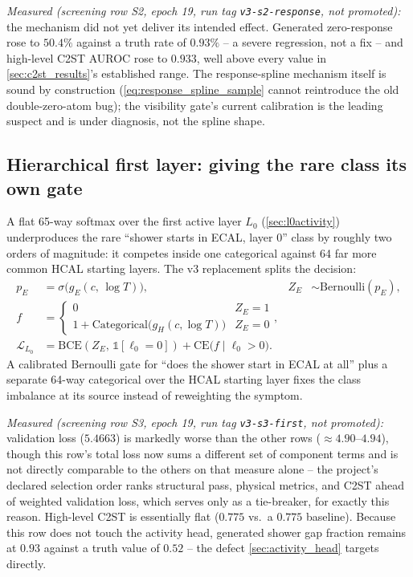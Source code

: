 \documentclass[10pt,a4paper]{article}
\begin{document}
\emph{Measured (screening row S2, epoch 19, run tag \texttt{v3-s2-response}, not promoted):} the mechanism did not yet deliver its intended effect. Generated zero-response rose to $50.4\%$ against a truth rate of $0.93\%$ -- a severe regression, not a fix -- and high-level C2ST AUROC rose to $0.933$, well above every value in \cref{sec:c2st_results}'s established range. The response-spline mechanism itself is sound by construction (\cref{eq:response_spline_sample} cannot reintroduce the old double-zero-atom bug); the visibility gate's current calibration is the leading suspect and is under diagnosis, not the spline shape.

\subsection{Hierarchical first layer: giving the rare class its own gate}
A flat 65-way softmax over the first active layer $L_0$ (\cref{sec:l0activity}) underproduces the rare ``shower starts in ECAL, layer 0'' class by roughly two orders of magnitude: it competes inside one categorical against 64 far more common HCAL starting layers. The v3 replacement splits the decision:
\begin{align}
p_E &= \sigma\big(g_E(c,\, \log T)\big), &Z_E &\sim \mathrm{Bernoulli}(p_E), \label{eq:firstlayer_gate}\\
f &= \begin{cases} 0 & Z_E = 1 \\ 1 + \mathrm{Categorical}\big(g_H(c,\log T)\big) & Z_E = 0 \end{cases}, & &\\
\mathcal{L}_{L_0} &= \mathrm{BCE}(Z_E,\, \mathbb{1}[\ell_0{=}0]) + \mathrm{CE}\big(f \mid \ell_0 > 0\big). & &
\label{eq:firstlayer_loss}
\end{align}
A calibrated Bernoulli gate for ``does the shower start in ECAL at all'' plus a separate 64-way categorical over the HCAL starting layer fixes the class imbalance at its source instead of reweighting the symptom.

\emph{Measured (screening row S3, epoch 19, run tag \texttt{v3-s3-first}, not promoted):} validation loss ($5.4663$) is markedly worse than the other rows ($\approx4.90$--$4.94$), though this row's total loss now sums a different set of component terms and is not directly comparable to the others on that measure alone -- the project's declared selection order ranks structural pass, physical metrics, and C2ST ahead of weighted validation loss, which serves only as a tie-breaker, for exactly this reason. High-level C2ST is essentially flat ($0.775$ vs.\ a $0.775$ baseline). Because this row does not touch the activity head, generated shower gap fraction remains at $0.93$ against a truth value of $0.52$ -- the defect \cref{sec:activity_head} targets directly.
\end{document}
